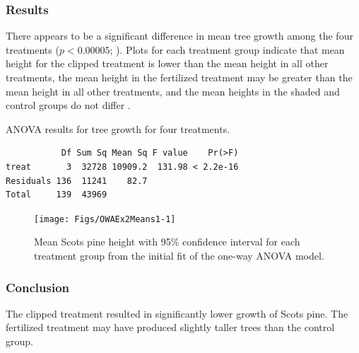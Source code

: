 \documentclass[10pt,openany]{book}\usepackage[]{graphicx}\usepackage[]{color}
\makeatletter
\newenvironment{kframe}{%
 \def\at@end@of@kframe{}%
 \ifinner\ifhmode%
  \def\at@end@of@kframe{\end{minipage}}%
  \begin{minipage}{\columnwidth}%
 \fi\fi%
 \def\FrameCommand##1{\hskip\@totalleftmargin \hskip-\fboxsep
 \colorbox{shadecolor}{##1}\hskip-\fboxsep
     \hskip-\linewidth \hskip-\@totalleftmargin \hskip\columnwidth}%
 \MakeFramed {\advance\hsize-\width
   \@totalleftmargin\z@ \linewidth\hsize
   \@setminipage}}%
 {\par\unskip\endMakeFramed%
 \at@end@of@kframe}
\newenvironment{knitrout}{}{} %
\makeatother
\begin{document}
\subsubsection*{Results}
There appears to be a significant difference in mean tree growth among the four treatments ($p<0.00005$; ).  Plots for each treatment group indicate that mean height for the clipped treatment is lower than the mean height in all other treatments, the mean height in the fertilized treatment may be greater than the mean height in all other treatments, and the mean heights in the shaded and control groups do not differ .

\begin{table}[h]
  \centering
  \caption{ANOVA results for tree growth for four treatments.}\label{tab:OWAEx2ANOVA}
\begin{knitrout}
\color{fgcolor}\begin{kframe}
\begin{verbatim}
           Df Sum Sq Mean Sq F value    Pr(>F)
treat       3  32728 10909.2  131.98 < 2.2e-16
Residuals 136  11241    82.7                  
Total     139  43969                          
\end{verbatim}
\end{kframe}
\end{knitrout}
\end{table}

\begin{knitrout}
\color{fgcolor}\begin{figure}[hbtp]

{\centering \texttt{[image: Figs/OWAEx2Means1-1]} 

}

\caption[Mean Scots pine height with 95\% confidence interval for each treatment group from the initial fit of the one-way ANOVA model]{Mean Scots pine height with 95\% confidence interval for each treatment group from the initial fit of the one-way ANOVA model.}\label{fig:OWAEx2Means1}
\end{figure}


\end{knitrout}

\subsubsection*{Conclusion}
The clipped treatment resulted in significantly lower growth of Scots pine.  The fertilized treatment may have produced slightly taller trees than the control group.
\end{document}
